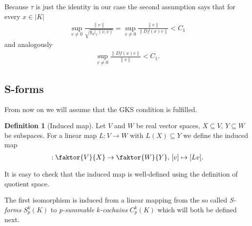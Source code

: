 \documentclass[12pt,a4paper]{article}
\theoremstyle{definition}
\newtheorem{definition}{Definition}
\begin{document}
Because $\tau$ is just the identity in our case 
the second assumption says that for every 
$x \in |K|$
\begin{align*}
\sup\limits_{v \neq 0} \frac{\lVert v \rVert}{\sqrt{g_S|_x(v,v)}} =
\sup\limits_{v \neq 0} \frac{\lVert v \rVert}{\lVert Df(x)v\rVert} < C_1
\end{align*}
and analogously
\begin{align*}
    \sup\limits_{v \neq 0} \frac{\lVert Df(x)v\rVert}{\lVert v \rVert} < C_1.
\end{align*}

\subsection{S-forms}
From now on we will assume that the GKS condition is fulfilled.

\begin{definition}[Induced map]
    Let $V$ and $W$ be real vector spaces, $X \subseteq V$, $Y \subseteq W$ be 
    subspaces. For a linear map $L: V \rightarrow W$ with $L(X) \subseteq Y$ 
    we define the induced map
    \begin{align*}
        [L]: \faktor{V}{X} \rightarrow \faktor{W}{Y},\,
        [v] \mapsto [Lv].
    \end{align*}     
\end{definition}
It is easy to check that the induced map is well-defined using the
definition of quotient space. %


The first isomorphism is induced from a linear mapping
from the so called \textit{S-forms} 
$S_p^k(K)$ to \textit{p-summable $k$-cochains} $C_p^k(K)$ which will both 
be defined next.
\end{document}
